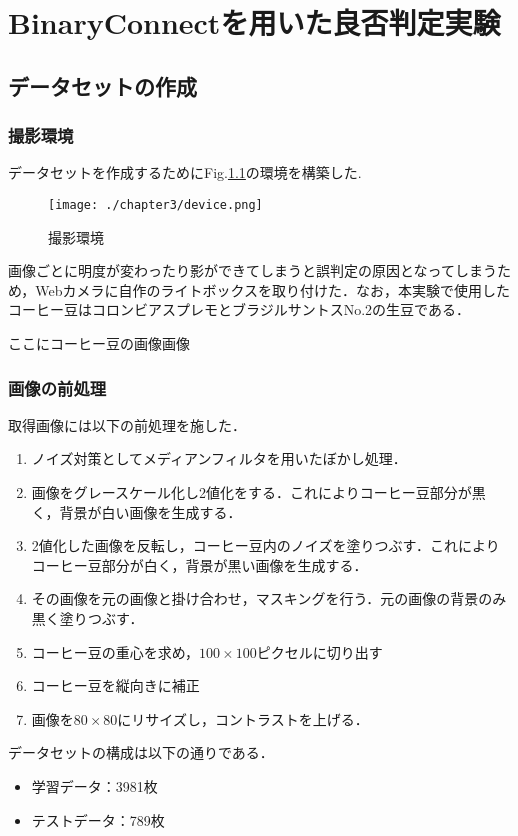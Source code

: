 
\chapter{BinaryConnectを用いた良否判定実験}

\section{データセットの作成}
\subsection{撮影環境}
データセットを作成するためにFig.\ref{fig_camera}の環境を構築した.
\begin{figure}[]
  \begin{center}
    \texttt{[image: ./chapter3/device.png]}
    \caption{撮影環境}
    \label{fig_camera}
  \end{center}
\end{figure}
画像ごとに明度が変わったり影ができてしまうと誤判定の原因となってしまうため，Webカメラに自作のライトボックスを取り付けた．なお，本実験で使用したコーヒー豆はコロンビアスプレモとブラジルサントスNo.2の生豆である．

ここにコーヒー豆の画像画像

\subsection{画像の前処理}
取得画像には以下の前処理を施した．
\begin{enumerate}
\item ノイズ対策としてメディアンフィルタを用いたぼかし処理．
\item 画像をグレースケール化し2値化をする．これによりコーヒー豆部分が黒く，背景が白い画像を生成する．
\item 2値化した画像を反転し，コーヒー豆内のノイズを塗りつぶす．これによりコーヒー豆部分が白く，背景が黒い画像を生成する．
\item その画像を元の画像と掛け合わせ，マスキングを行う．元の画像の背景のみ黒く塗りつぶす．
\item コーヒー豆の重心を求め，$100\times 100$ピクセルに切り出す
\item コーヒー豆を縦向きに補正
\item 画像を$80\times 80$にリサイズし，コントラストを上げる．
\end{enumerate}

データセットの構成は以下の通りである．
\begin{itemize}
  \item 学習データ：3981枚
  \item テストデータ：789枚
\end{itemize}

